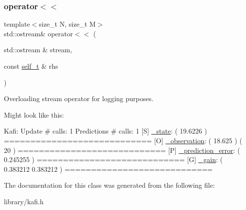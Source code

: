 \subsubsection{\texorpdfstring{operator$<$$<$}{operator<<}}
{\footnotesize\ttfamily template$<$size\+\_\+t N, size\+\_\+t M$>$ \\
std\+::ostream\& operator$<$$<$ (\begin{DoxyParamCaption}\item[{std\+::ostream \&}]{stream,  }\item[{const \hyperlink{classkafi_1_1kafi_a9fc1cf6d76a14493ec33c03f3a3699c7}{self\+\_\+t} \&}]{rhs }\end{DoxyParamCaption})\hspace{0.3cm}{\ttfamily [friend]}}



Overloading stream operator for logging purposes. 

Might look like this\+: 
\begin{DoxyCode}
Kafi:
  Update      # calls: 1
  Predictions # calls: 1
 [S] \hyperlink{classkafi_1_1kafi_a83457abd1caed518a3c162b873f8e39c}{\_state}:
(      19.6226 )
============================
 [O] \hyperlink{classkafi_1_1kafi_acd1957b1eef474dab5ddb3122b833f56}{\_observation}:
(       18.625 )
(           20 )
============================
 [P] \hyperlink{classkafi_1_1kafi_abcaf040c76f04e76cd3759ef292aacca}{\_prediction\_error}:
(     0.245255 )
============================
 [G] \hyperlink{classkafi_1_1kafi_af88dd9bf341987b55a6c3cb67bc274d2}{\_gain}:
(     0.383212     0.383212 )
============================
\end{DoxyCode}
 

The documentation for this class was generated from the following file\+:\begin{DoxyCompactItemize}
\item 
library/kafi.\+h\end{DoxyCompactItemize}
